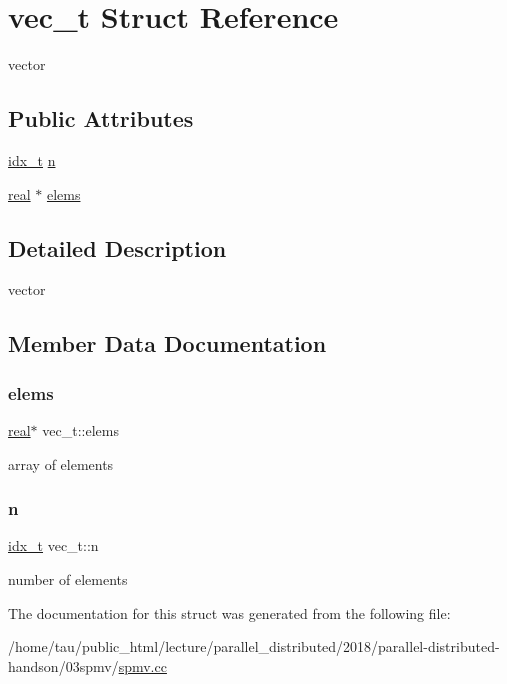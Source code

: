 \hypertarget{structvec__t}{}\section{vec\+\_\+t Struct Reference}
\label{structvec__t}


vector  


\subsection*{Public Attributes}
\begin{DoxyCompactItemize}
\item 
\hyperlink{spmv_8cc_a8e93478a00e685bea5e6a3f617bf03a3}{idx\+\_\+t} \hyperlink{structvec__t_a06879ff4054298fbc680b02e3e18da7a}{n}
\item 
\hyperlink{spmv_8cc_a11d147c64891830c9e79b3315b1b2e21}{real} $\ast$ \hyperlink{structvec__t_a7d62f0b683ab0558903c5227d670ac1a}{elems}
\end{DoxyCompactItemize}


\subsection{Detailed Description}
vector 

\subsection{Member Data Documentation}
\mbox{\label{structvec__t_a7d62f0b683ab0558903c5227d670ac1a}} 
\subsubsection{\texorpdfstring{elems}{elems}}
{\footnotesize\ttfamily \hyperlink{spmv_8cc_a11d147c64891830c9e79b3315b1b2e21}{real}$\ast$ vec\+\_\+t\+::elems}

array of elements \mbox{\label{structvec__t_a06879ff4054298fbc680b02e3e18da7a}} 
\subsubsection{\texorpdfstring{n}{n}}
{\footnotesize\ttfamily \hyperlink{spmv_8cc_a8e93478a00e685bea5e6a3f617bf03a3}{idx\+\_\+t} vec\+\_\+t\+::n}

number of elements 

The documentation for this struct was generated from the following file\+:\begin{DoxyCompactItemize}
\item 
/home/tau/public\+\_\+html/lecture/parallel\+\_\+distributed/2018/parallel-\/distributed-\/handson/03spmv/\hyperlink{spmv_8cc}{spmv.\+cc}\end{DoxyCompactItemize}
